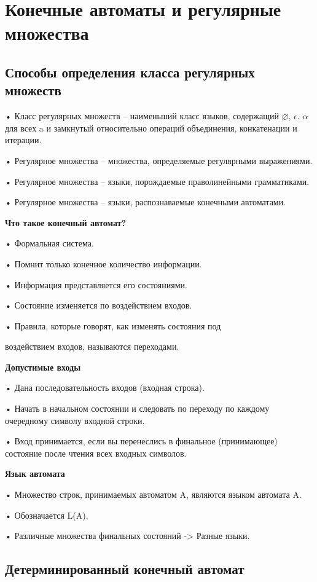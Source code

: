 \documentclass{article}
\begin{document}
\section{Конечные автоматы и регулярные множества}

\subsection{Способы определения класса регулярных множеств}

• Класс регулярных множеств – наименьший класс языков,
содержащий $\varnothing$, {$\epsilon$}. {$\alpha$} для всех a и замкнутый относительно
операций объединения, конкатенации и итерации.

• Регулярное множества – множества, определяемые регулярными
выражениями.

• Регулярное множества – языки, порождаемые праволинейными
грамматиками.

• Регулярное множества – языки, распознаваемые конечными
автоматами.

\textbf{Что такое конечный автомат?}

• Формальная система.

• Помнит только конечное количество информации.

• Информация представляется его состояниями.

• Состояние изменяется по воздействием входов.

• Правила, которые говорят, как изменять состояния под

воздействием входов, называются переходами.


\textbf{Допустимые входы}


• Дана последовательность входов (входная строка).

• Начать в начальном состоянии и следовать по переходу по
каждому очередному символу входной строки.

• Вход принимается, если вы перенеслись в финальное
(принимающее) состояние после чтения всех входных символов.

\textbf{Язык автомата}

• Множество строк, принимаемых автоматом A, являются языком
автомата A.

• Обозначается L(A).

• Различные множества финальных состояний -> Разные языки.


\subsection{Детерминированный конечный автомат}
\end{document}
